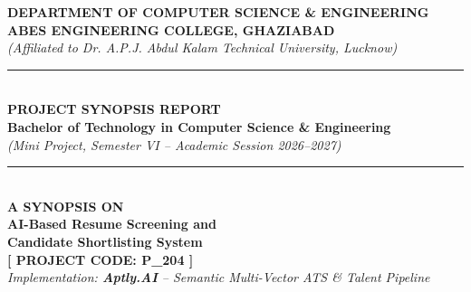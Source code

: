 \documentclass[12pt, a4paper]{article}
\begin{document}
\begin{titlepage}

    \centering
    \vspace*{0.3cm}
    
    {\large \textbf{\color{primary} DEPARTMENT OF COMPUTER SCIENCE \& ENGINEERING}}\\[0.15cm]
    {\Large \textbf{ABES ENGINEERING COLLEGE, GHAZIABAD}}\\[0.1cm]
    {\footnotesize \textit{(Affiliated to Dr. A.P.J. Abdul Kalam Technical University, Lucknow)}}\\[0.5cm]
    
    {\color{secondary}\rule{0.82\textwidth}{1.2pt}}\\[0.25cm]
    {\LARGE \textbf{\color{primary} PROJECT SYNOPSIS REPORT}}\\[0.15cm]
    {\normalsize \textbf{Bachelor of Technology in Computer Science \& Engineering}}\\[0.1cm]
    {\small \textit{(Mini Project, Semester VI -- Academic Session 2026--2027)}}\\[0.25cm]
    {\color{secondary}\rule{0.82\textwidth}{1.2pt}}\\[0.8cm]
    
    {\small \textbf{A SYNOPSIS ON}}\\[0.35cm]
    
    {\huge \bfseries \color{primary} AI-Based Resume Screening and}\\[0.25cm]
    {\huge \bfseries \color{primary} Candidate Shortlisting System}\\[0.45cm]
    
    {\Large \textbf{\color{secondary} [ PROJECT CODE: P\_204 ]}}\\[0.3cm]
    {\normalsize \textit{Implementation: \textbf{Aptly.AI} -- Semantic Multi-Vector ATS \& Talent Pipeline}}\\[1.2cm]
    

\end{titlepage}
\end{document}
